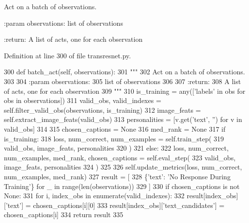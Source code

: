 \begin{DoxyVerb}Act on a batch of observations.

:param observations:
    list of observations

:return:
    A list of acts, one for each observation
\end{DoxyVerb}
 

Definition at line 300 of file transresnet.\+py.


\begin{DoxyCode}
300     \textcolor{keyword}{def }batch\_act(self, observations):
301         \textcolor{stringliteral}{"""}
302 \textcolor{stringliteral}{        Act on a batch of observations.}
303 \textcolor{stringliteral}{}
304 \textcolor{stringliteral}{        :param observations:}
305 \textcolor{stringliteral}{            list of observations}
306 \textcolor{stringliteral}{}
307 \textcolor{stringliteral}{        :return:}
308 \textcolor{stringliteral}{            A list of acts, one for each observation}
309 \textcolor{stringliteral}{        """}
310         is\_training = any([\textcolor{stringliteral}{'labels'} \textcolor{keywordflow}{in} obs \textcolor{keywordflow}{for} obs \textcolor{keywordflow}{in} observations])
311         valid\_obs, valid\_indexes = self.filter\_valid\_obs(observations, is\_training)
312         image\_feats = self.extract\_image\_feats(valid\_obs)
313         personalities = [v.get(\textcolor{stringliteral}{'text'}, \textcolor{stringliteral}{''}) \textcolor{keywordflow}{for} v \textcolor{keywordflow}{in} valid\_obs]
314 
315         chosen\_captions = \textcolor{keywordtype}{None}
316         med\_rank = \textcolor{keywordtype}{None}
317         \textcolor{keywordflow}{if} is\_training:
318             loss, num\_correct, num\_examples = self.train\_step(
319                 valid\_obs, image\_feats, personalities
320             )
321         \textcolor{keywordflow}{else}:
322             loss, num\_correct, num\_examples, med\_rank, chosen\_captions = self.eval\_step(
323                 valid\_obs, image\_feats, personalities
324             )
325 
326         self.update\_metrics(loss, num\_correct, num\_examples, med\_rank)
327         result = [
328             \{\textcolor{stringliteral}{'text'}: \textcolor{stringliteral}{'No Response During Training'}\} \textcolor{keywordflow}{for} \_ \textcolor{keywordflow}{in} range(len(observations))
329         ]
330         \textcolor{keywordflow}{if} chosen\_captions \textcolor{keywordflow}{is} \textcolor{keywordflow}{not} \textcolor{keywordtype}{None}:
331             \textcolor{keywordflow}{for} i, index\_obs \textcolor{keywordflow}{in} enumerate(valid\_indexes):
332                 result[index\_obs][\textcolor{stringliteral}{'text'}] = chosen\_captions[i][0]
333                 result[index\_obs][\textcolor{stringliteral}{'text\_candidates'}] = chosen\_captions[i]
334         \textcolor{keywordflow}{return} result
335 
\end{DoxyCode}
